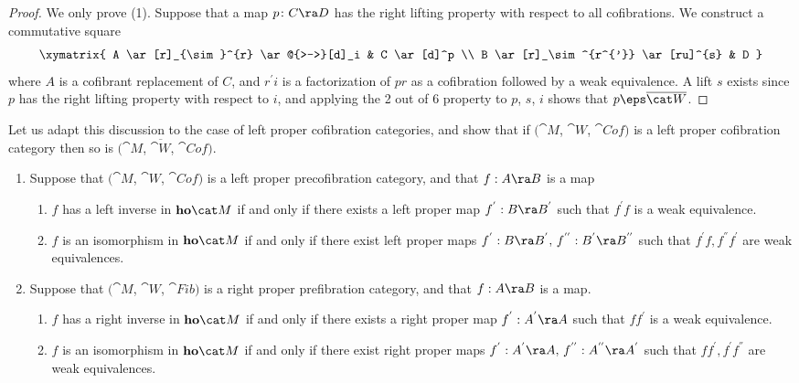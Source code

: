 \begin{proof}
We only prove (1). Suppose that a map $p \colon C \ra D$ has the right lifting property with respect to all cofibrations. We construct a commutative square
\[
\xymatrix{
  A \ar[r]_{\sim}^{r} \ar@{>->}[d]_i & C \ar[d]^p \\
  B \ar[r]_\sim^{r^{'}} \ar[ru]^{s} & D
}
\]
where $A$ is a cofibrant replacement of $C$, and $r^{'}i$ is a factorization of $pr$ as a cofibration followed by a weak equivalence. A lift $s$ exists since $p$ has the right lifting property with respect to $i$, and applying the 2 out of 6 property to $p$, $s$, $i$ shows that $p \eps \overline{\cat W}$.
\end{proof}


Let us adapt this discussion to the case of left proper cofibration categories, and show that if $({\cat M}$, ${\cat W}$, ${\cat Cof})$ is a left proper cofibration category then so is $({\cat M}$, $\overline{\cat W}$, ${\cat Cof})$.

\begin{lem}
\label{lem::cofcatequivinhomotcatproper}
\mbox{}
\begin{enumerate}
\item
Suppose that $({\cat M}$, ${\cat W}$, ${\cat Cof})$ is a left proper precofibration category, and that $f:A \ra B$ is a map
\begin{enumerate}
\item
$f$ has a left inverse in ${\bf ho}{\cat M}$ if and only if there exists a left proper map $f^{'}:B \ra B^{'}$ such that $f^{'}f$ is a weak equivalence.
\item
$f$ is an isomorphism in ${\bf ho}{\cat M}$ if and only if there exist left proper maps $f^{'}:B \ra B^{'}, \, f^{''}:B^{'} \ra B^{''}$ such that $f^{'}f, f^{''}f^{'}$ are weak equivalences.
\end{enumerate}
\item
Suppose that $({\cat M}$, ${\cat W}$, ${\cat Fib})$ is a right proper prefibration category, and that $f:A \ra B$ is a map.
\begin{enumerate}
\item
$f$ has a right inverse in ${\bf ho}{\cat M}$ if and only if there exists a right proper map $f^{'}:A^{'} \ra A$ such that $ff^{'}$ is a weak equivalence.
\item
$f$ is an isomorphism in ${\bf ho}{\cat M}$ if and only if there exist right proper maps $f^{'}:A^{'} \ra A, \, f^{''}:A^{''} \ra A^{'}$ such that $ff^{'}, f^{'}f^{''}$ are weak equivalences.
\end{enumerate}
\end{enumerate}
\end{lem}

